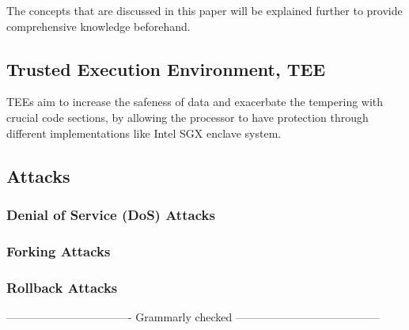 The concepts that are discussed in this paper will be explained further to provide comprehensive knowledge beforehand.

\subsection{Trusted Execution Environment, TEE}

TEEs aim to increase the safeness of data and exacerbate the tempering with crucial code sections, by allowing the processor to have protection through different implementations 
like Intel SGX enclave system. 

\subsection{Attacks}

\subsubsection{Denial of Service (DoS) Attacks}

\subsubsection{Forking Attacks}

\subsubsection{Rollback Attacks}



---------------------------------- Grammarly checked ---------------------------------------
